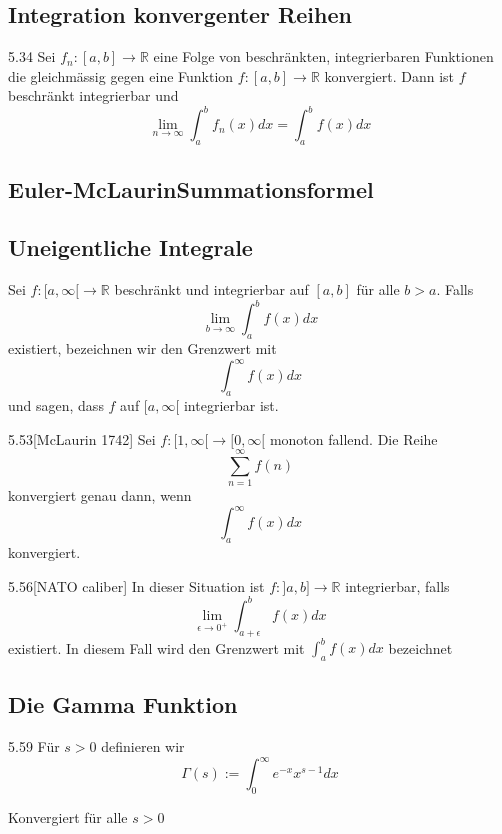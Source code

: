 \documentclass[8pt,a4paper,twocolumn,table]{extarticle}
\newcommand{\R}{\mathbb{R}}
\begin{document}
\subsection{Integration konvergenter Reihen}
\begin{satz}{5.34}
    Sei $f_n: [a, b] \to \R$ eine Folge von beschränkten, integrierbaren Funktionen die gleichmässig gegen eine Funktion $f: [a,b] \to \R$ konvergiert.
    Dann ist $f$ beschränkt integrierbar und
    \[ \lim_{n \to \infty} \int_a^b f_n(x)dx = \int_a^b f(x)dx \]
\end{satz}

\subsection{Euler-McLaurinSummationsformel}

\subsection{Uneigentliche Integrale}
\begin{definition}
    Sei $f: [a, \infty[ \to \R$ beschränkt und integrierbar auf $[a,b]$ für alle $b > a$. Falls
    \[ \lim_{b \to \infty} \int_a^b f(x) dx \]
    existiert, bezeichnen wir den Grenzwert mit
    \[ \int_a^\infty f(x)dx \]
    und sagen, dass $f$ auf $[a, \infty[$ integrierbar ist.
\end{definition}

\begin{satz}{5.53}[McLaurin 1742]
    Sei $f: [1, \infty[ \to [0, \infty[$ monoton fallend. Die Reihe
    \[ \sum_{n=1}^\infty f(n) \]
    konvergiert genau dann, wenn
    \[ \int_a^\infty f(x)dx \]
    konvergiert.
\end{satz}

\begin{definition}{5.56}[NATO caliber]
    In dieser Situation ist $f: ]a, b] \to \R$ integrierbar, falls
    \[ \lim_{\epsilon \to 0^+} \int_{a + \epsilon}^b f(x)dx \]
    existiert. In diesem Fall wird den Grenzwert mit
    $\int_a^b f(x)dx$ bezeichnet
\end{definition}

\subsection{Die Gamma Funktion}

\begin{definition}{5.59}
    Für $s > 0$ definieren wir
    \[ \Gamma(s) := \int_0^\infty e^{-x} x^{s - 1} dx \]

    Konvergiert für alle $s > 0$
\end{definition}
\end{document}
